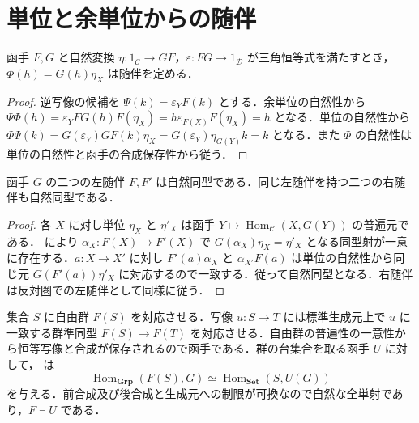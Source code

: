 \section{単位と余単位からの随伴}
\begin{prop}[三角恒等式による随伴の判定]
函手 $F,G$ と自然変換 $\eta:1_{\mathcal C}\to GF$，$\varepsilon:FG\to1_{\mathcal D}$ が三角恒等式を満たすとき，$\Phi(h)=G(h)\eta_X$ は随伴を定める．
\end{prop}
\begin{proof}
逆写像の候補を $\Psi(k)=\varepsilon_YF(k)$ とする．余単位の自然性から $\Psi\Phi(h)=\varepsilon_YFG(h)F(\eta_X)=h\varepsilon_{F(X)}F(\eta_X)=h$ となる．単位の自然性から $\Phi\Psi(k)=G(\varepsilon_Y)GF(k)\eta_X=G(\varepsilon_Y)\eta_{G(Y)}k=k$ となる．また $\Phi$ の自然性は単位の自然性と函手の合成保存性から従う．
\end{proof}
\begin{prop}[随伴函手の一意性]
函手 $G$ の二つの左随伴 $F,F'$ は自然同型である．同じ左随伴を持つ二つの右随伴も自然同型である．
\end{prop}
\begin{proof}
各 $X$ に対し単位 $\eta_X$ と $\eta'_X$ は函手 $Y\mapsto\operatorname{Hom}_{\mathcal C}(X,G(Y))$ の普遍元である． により $\alpha_X:F(X)\to F'(X)$ で $G(\alpha_X)\eta_X=\eta'_X$ となる同型射が一意に存在する．$a:X\to X'$ に対し $F'(a)\alpha_X$ と $\alpha_{X'}F(a)$ は単位の自然性から同じ元 $G(F'(a))\eta'_X$ に対応するので一致する．従って自然同型となる．右随伴は反対圏での左随伴として同様に従う．
\end{proof}
\begin{prop}[自由群函手と忘却函手の随伴]
集合 $S$ に自由群 $F(S)$ を対応させる．写像 $u:S\to T$ には標準生成元上で $u$ に一致する群準同型 $F(S)\to F(T)$ を対応させる．自由群の普遍性の一意性から恒等写像と合成が保存されるので函手である．群の台集合を取る函手 $U$ に対して， は
\[
 \operatorname{Hom}_{\mathbf{Grp}}(F(S),G)
 \simeq \operatorname{Hom}_{\mathbf{Set}}(S,U(G))
\]
を与える．前合成及び後合成と生成元への制限が可換なので自然な全単射であり，$F\dashv U$ である．
\end{prop}
